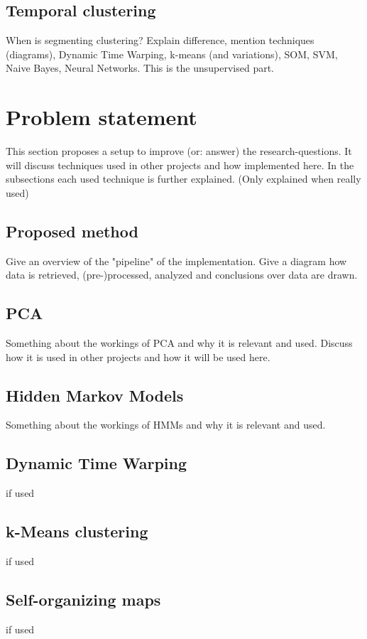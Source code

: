 \documentclass[a4paper,10pt]{extarticle}
\begin{document}
  \subsection{Temporal clustering}
  When is segmenting clustering? Explain difference, mention techniques (diagrams), Dynamic Time Warping, k-means (and variations), SOM, SVM, Naive Bayes, Neural Networks. This is the unsupervised part.




\section{Problem statement}
This section proposes a setup to improve (or: answer) the research-questions. It will discuss techniques used in other projects and how implemented here. In the subsections each used technique is further explained. (Only explained when really used)

  \subsection{Proposed method}
  Give an overview of the "pipeline" of the implementation. Give a diagram how data is retrieved, (pre-)processed, analyzed and conclusions over data are drawn.

  \subsection{PCA}
  Something about the workings of PCA and why it is relevant and used. Discuss how it is used in other projects and how it will be used here.

  \subsection{Hidden Markov Models}
  Something about the workings of HMMs and why it is relevant and used.

  \subsection{Dynamic Time Warping}
  if used

  \subsection{k-Means clustering}
  if used

  \subsection{Self-organizing maps}
  if used
\end{document}
